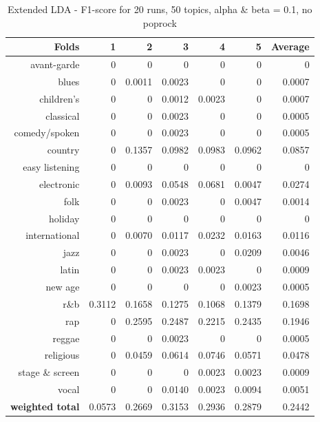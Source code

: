 \begin{table}[h]\label{table:extended_nopoprock}
\begin{subtable}[b]{0.8\textwidth}
\begin{tabular}{| r | r | r | r | r | r | r |}
\hline
\textbf{Folds} &  \textbf{1} & \textbf{2} & \textbf{3} & \textbf{4} & \textbf{5} & \textbf{Average}\\
\hline
avant-garde & 0 & 0 & 0 & 0 & 0 & 0\\
blues & 0 & 0.0011 & 0.0023 & 0 & 0 & 0.0007\\
children's & 0 & 0 & 0.0012 & 0.0023 & 0 & 0.0007\\
classical & 0 & 0  & 0.0023 & 0 & 0 & 0.0005\\
comedy/spoken & 0 & 0 & 0.0023 & 0 & 0 & 0.0005 \\
country & 0 & 0.1357 & 0.0982 & 0.0983 & 0.0962 & 0.0857 \\
easy listening & 0 & 0 & 0 & 0 & 0 & 0 \\
electronic & 0 & 0.0093 & 0.0548 & 0.0681 & 0.0047 & 0.0274\\
folk & 0 & 0 & 0.0023 & 0 & 0.0047 & 0.0014\\
holiday & 0 & 0 & 0 & 0 & 0 & 0 \\
international & 0 & 0.0070 & 0.0117 & 0.0232 & 0.0163 & 0.0116\\
jazz & 0 & 0 & 0.0023 & 0 & 0.0209 & 0.0046 \\
latin & 0 & 0 & 0.0023 & 0.0023 & 0 & 0.0009\\
new age & 0 & 0 & 0 & 0 & 0.0023 & 0.0005\\\
r\&b & 0.3112 & 0.1658 & 0.1275 &  0.1068 & 0.1379& 0.1698\\
rap & 0 & 0.2595 & 0.2487 & 0.2215 & 0.2435 & 0.1946\\
reggae & 0 & 0 & 0.0023 & 0 & 0 & 0.0005\\
religious & 0 & 0.0459 & 0.0614 & 0.0746 & 0.0571 & 0.0478\\
stage \& screen & 0 & 0 & 0 & 0.0023 & 0.0023 & 0.0009\\
vocal & 0 & 0 & 0.0140 & 0.0023 & 0.0094 & 0.0051\\
\hline
\textbf{weighted total} &  0.0573 & 0.2669 & 0.3153 & 0.2936 & 0.2879 & 0.2442\\
\hline
\end{tabular}
\caption{Extended LDA - F1-score for 20 runs, 50 topics, alpha \& beta = 0.1, no poprock}
\end{subtable}
\begin{subtable}[b]{0.8\textwidth}

\end{subtable}
\end{table}
